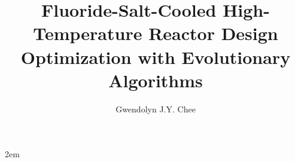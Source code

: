 \documentclass[edeposit,fullpage,12pt]{uiucthesis2009}
\title{Fluoride-Salt-Cooled High-Temperature Reactor Design Optimization with Evolutionary Algorithms}
\author{Gwendolyn J.Y. Chee}
\begin{document}

%
\maketitle
\justify
\parindent 2em%

%

%    

%
\tableofcontents

%

%

%


%

\mainmatter
\end{document}
